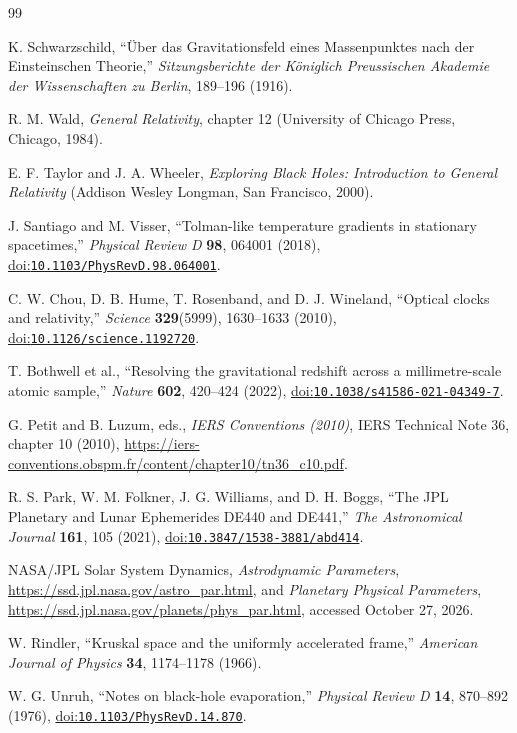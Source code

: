 \documentclass[12pt]{article}
\begin{document}
\clearpage
\begin{thebibliography}{99}
\small
{}
\raggedright
{}

K. Schwarzschild,
``\"Uber das Gravitationsfeld eines Massenpunktes nach der Einsteinschen Theorie,''
\emph{Sitzungsberichte der K\"oniglich Preussischen Akademie der Wissenschaften zu Berlin}, 189--196 (1916).

R. M. Wald,
\emph{General Relativity}, chapter 12 (University of Chicago Press, Chicago, 1984).

E. F. Taylor and J. A. Wheeler,
\emph{Exploring Black Holes: Introduction to General Relativity}
(Addison Wesley Longman, San Francisco, 2000).

J. Santiago and M. Visser,
``Tolman-like temperature gradients in stationary spacetimes,''
\emph{Physical Review D} \textbf{98}, 064001 (2018),
\href{https://doi.org/10.1103/PhysRevD.98.064001}{doi:\nolinkurl{10.1103/PhysRevD.98.064001}}.

C. W. Chou, D. B. Hume, T. Rosenband, and D. J. Wineland,
``Optical clocks and relativity,''
\emph{Science} \textbf{329}(5999), 1630--1633 (2010),
\href{https://doi.org/10.1126/science.1192720}{doi:\nolinkurl{10.1126/science.1192720}}.

T. Bothwell et al.,
``Resolving the gravitational redshift across a millimetre-scale atomic sample,''
\emph{Nature} \textbf{602}, 420--424 (2022),
\href{https://doi.org/10.1038/s41586-021-04349-7}{doi:\nolinkurl{10.1038/s41586-021-04349-7}}.

G. Petit and B. Luzum, eds.,
\emph{IERS Conventions (2010)}, IERS Technical Note 36, chapter 10 (2010),
\url{https://iers-conventions.obspm.fr/content/chapter10/tn36_c10.pdf}.

R. S. Park, W. M. Folkner, J. G. Williams, and D. H. Boggs,
``The JPL Planetary and Lunar Ephemerides DE440 and DE441,''
\emph{The Astronomical Journal} \textbf{161}, 105 (2021),
\href{https://doi.org/10.3847/1538-3881/abd414}{doi:\nolinkurl{10.3847/1538-3881/abd414}}.

NASA/JPL Solar System Dynamics,
\emph{Astrodynamic Parameters}, \url{https://ssd.jpl.nasa.gov/astro_par.html}, and
\emph{Planetary Physical Parameters}, \url{https://ssd.jpl.nasa.gov/planets/phys_par.html},
accessed October 27, 2026.

W. Rindler,
``Kruskal space and the uniformly accelerated frame,''
\emph{American Journal of Physics} \textbf{34}, 1174--1178 (1966).

W. G. Unruh,
``Notes on black-hole evaporation,''
\emph{Physical Review D} \textbf{14}, 870--892 (1976),
\href{https://doi.org/10.1103/PhysRevD.14.870}{doi:\nolinkurl{10.1103/PhysRevD.14.870}}.

\end{thebibliography}
\end{document}
